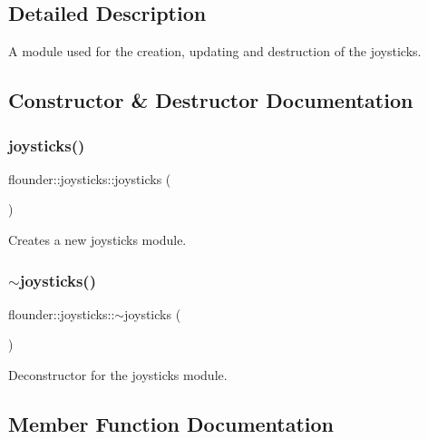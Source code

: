 \subsection{Detailed Description}
A module used for the creation, updating and destruction of the joysticks. 



\subsection{Constructor \& Destructor Documentation}
\mbox{\label{classflounder_1_1joysticks_ad0676c90afa28b4fb69de64c253e9c34}} 
\subsubsection{\texorpdfstring{joysticks()}{joysticks()}}
{\footnotesize\ttfamily flounder\+::joysticks\+::joysticks (\begin{DoxyParamCaption}{ }\end{DoxyParamCaption})}



Creates a new joysticks module. 

\mbox{\label{classflounder_1_1joysticks_aaab9cf61c7c5d6736742347c7c657ed8}} 
\subsubsection{\texorpdfstring{$\sim$joysticks()}{~joysticks()}}
{\footnotesize\ttfamily flounder\+::joysticks\+::$\sim$joysticks (\begin{DoxyParamCaption}{ }\end{DoxyParamCaption})}



Deconstructor for the joysticks module. 



\subsection{Member Function Documentation}
\mbox{\label{classflounder_1_1joysticks_a2c47c69053bf582ee6eb22d135d71084}} 
